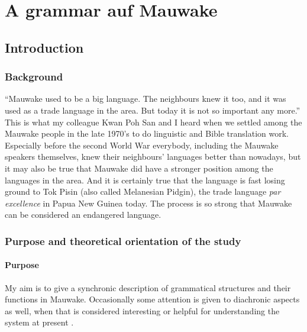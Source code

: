 
\chapter{A grammar auf Mauwake}
\section{Introduction}
\hypertarget{RefHeading18281935131865}{}\subsection{Background}
\hypertarget{RefHeading18301935131865}{}``Mauwake used to be a big language. The neighbours knew it too, and it was used as a trade language in the area. But today it is not so important any more.'' This is what my colleague Kwan Poh San and I heard when we settled among the Mauwake people in the late 1970's to do linguistic and Bible translation work. Especially before the second World War everybody, including the Mauwake speakers themselves, knew their neighbours' languages better than nowadays, but it may also be true that Mauwake did have a stronger position among the languages in the area. And it is certainly true that the language is fast losing ground to Tok Pisin (also called Melanesian Pidgin), the trade language \textit{par excellence} in Papua New Guinea today.  The process is so strong that Mauwake can be considered an endangered language.

\subsection{Purpose and theoretical orientation of the study}
\hypertarget{RefHeading18321935131865}{}\subsubsection{Purpose}
\hypertarget{RefHeading18341935131865}{}My aim is to give a synchronic description of grammatical structures and their functions in Mauwake. Occasionally some attention is given to diachronic aspects as well, when that is considered interesting or helpful for understanding the system at present \citep[20]{EvansEtAl2006}%
. 

